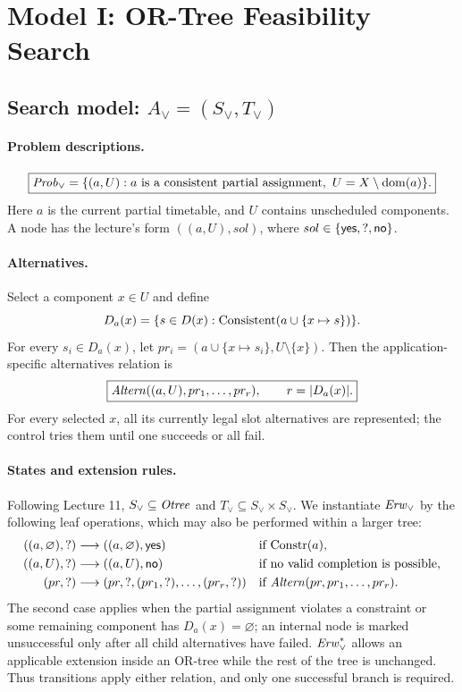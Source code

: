 \section{Model I: OR-Tree Feasibility Search}
\label{sec:or}
\subsection{Search model: $A_{\lor}=(S_{\lor},T_{\lor})$}
\paragraph{Problem descriptions.}
\[
\boxed{\mathit{Prob}_{\lor}=\{(a,U):a\text{ is a consistent partial assignment},\ U=X\setminus\operatorname{dom}(a)\}.}
\]
Here $a$ is the current partial timetable, and $U$ contains unscheduled components. A node has the lecture's form $((a,U),sol)$, where $sol\in\{\mathsf{yes},\mathord{?},\mathsf{no}\}$.

\paragraph{Alternatives.}
Select a component $x\in U$ and define
\[
D_a(x)=\{s\in D(x):\operatorname{Consistent}(a\cup\{x\mapsto s\})\}.
\]
For every $s_i\in D_a(x)$, let $pr_i=(a\cup\{x\mapsto s_i\},U\setminus\{x\})$. Then the application-specific alternatives relation is
\[
\boxed{\mathit{Altern}((a,U),pr_1,\ldots,pr_r),\qquad r=|D_a(x)|.}
\]
For every selected $x$, all its currently legal slot alternatives are represented; the control tries them until one succeeds or all fail.

\paragraph{States and extension rules.}
Following Lecture 11, $S_{\lor}\subseteq\mathit{Otree}$ and $T_{\lor}\subseteq S_{\lor}\times S_{\lor}$. We instantiate $\mathit{Erw}_{\lor}$ by the following leaf operations, which may also be performed within a larger tree:
\begin{align*}
 ((a,\varnothing),\mathord{?})&\longrightarrow((a,\varnothing),\mathsf{yes})
 &&\text{if }\mathrm{Constr}(a),\\
 ((a,U),\mathord{?})&\longrightarrow((a,U),\mathsf{no})
 &&\text{if no valid completion is possible},\\
 (pr,\mathord{?})&\longrightarrow(pr,\mathord{?},(pr_1,\mathord{?}),\ldots,(pr_r,\mathord{?}))
 &&\text{if }\mathit{Altern}(pr,pr_1,\ldots,pr_r).
\end{align*}
The second case applies when the partial assignment violates a constraint or some remaining component has $D_a(x)=\varnothing$; an internal node is marked unsuccessful only after all child alternatives have failed. $\mathit{Erw}_{\lor}^{*}$ allows an applicable extension inside an OR-tree while the rest of the tree is unchanged. Thus transitions apply either relation, and only one successful branch is required.

